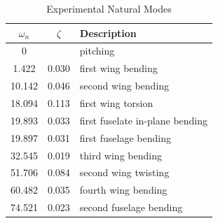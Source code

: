 \begin{table}[H]
    \centering
    \caption{Experimental Natural Modes}
    \begin{tabular}{ccl}
        \hline\hline
        $\omega_n$ & $\zeta$ & Description \\
        \hline
        0      &       & pitching \\
        1.422  & 0.030 & first wing bending \\
        10.142 & 0.046 & second wing bending \\
        18.094 & 0.113 & first wing torsion \\
        19.893 & 0.033 & first fuselate in-plane bending \\
        19.897 & 0.031 & first fuselage bending \\
        32.545 & 0.019 & third wing bending \\
        51.706 & 0.084 & second wing twisting \\
        60.482 & 0.035 & fourth wing bending \\
        74.521 & 0.023 & second fuselage bending \\
        \hline\hline
    \end{tabular}
    \label{tab:expModalData}
\end{table}
